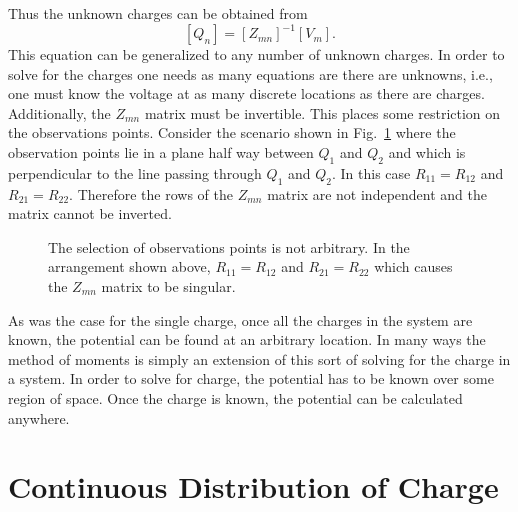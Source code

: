 Thus the unknown charges can be obtained from
\begin{equation}
  \left[Q_n\right] = \left[Z_{mn}\right]^{-1} \left[V_m\right].
  \label{eq:qnVector}
\end{equation}
This equation can be generalized to any number of unknown charges.  In
order to solve for the charges one needs as many equations are there
are unknowns, i.e., one must know the voltage at as many discrete
locations as there are charges.  Additionally, the $Z_{mn}$
matrix must be invertible.  This places some restriction on the
observations points.  Consider the scenario shown in
Fig.\ \ref{fig:singularZ} where the observation points lie in a plane
half way between $Q_1$ and $Q_2$ and which is perpendicular to the line
passing through $Q_1$ and $Q_2$.  In this case $R_{11}=R_{12}$ and 
$R_{21}=R_{22}$.  Therefore the rows of the $Z_{mn}$ matrix are not
independent and the matrix cannot be inverted.  
\begin{figure}
  \begin{center}
  \end{center}
  \caption{The selection of observations points is not arbitrary.  In
    the arrangement shown above, $R_{11}=R_{12}$ and $R_{21}=R_{22}$
    which causes the $Z_{mn}$ matrix to be singular.}
  \label{fig:singularZ}
\end{figure}

As was the case for the single charge, once all the charges in the
system are known, the potential can be found at an arbitrary location.
In many ways the method of moments is simply an extension of this sort
of solving for the charge in a system.  In order to solve for charge,
the potential has to be known over some region of space.  Once the
charge is known, the potential can be calculated anywhere.

\section{Continuous Distribution of Charge}

